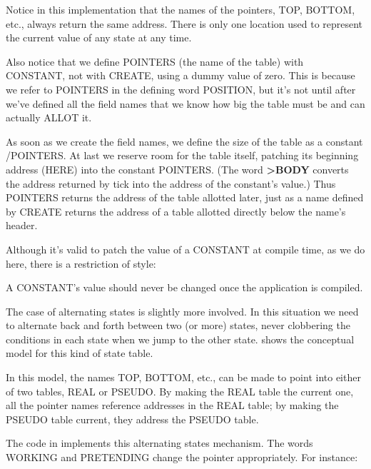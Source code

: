 Notice in this implementation that the names of the pointers, TOP,
BOTTOM, etc., always return the same address. There is only one location
used to represent the current value of any state at any time.

Also notice that we define POINTERS (the name of the table) with
CONSTANT, not with CREATE, using a dummy value of zero. This is
because we refer to POINTERS in the defining word POSITION, but it's
not until after we've defined all the field names that we know how big the
table must be and can actually ALLOT it.

As soon as we create the field names, we define the size of the table
as a constant /POINTERS. At last we reserve room for the table itself,
patching its beginning address (HERE) into the constant POINTERS.
(The word \textbf{>BODY} converts the address returned by tick into the
address of the constant's value.) Thus POINTERS returns the address of
the table allotted later, just as a name defined by CREATE returns the
address of a table allotted directly below the name's header.

Although it's valid to patch the value of a CONSTANT at compile
time, as we do here, there is a restriction of style:

\begin{tip}
A CONSTANT's value should never be changed once the application is
compiled.
\end{tip}
The case of alternating states is slightly more involved. In this situation
we need to alternate back and forth between two (or more) states, never
clobbering the conditions in each state when we jump to the other state.
 shows the conceptual model for this kind of state table.



In this model, the names TOP, BOTTOM, etc., can be made to point
into either of two tables, REAL or PSEUDO. By making the REAL table
the current one, all the pointer names reference addresses in the REAL
table; by making the PSEUDO table current, they address the PSEUDO
table.

The code in  implements this alternating states
mechanism. The words WORKING and PRETENDING change the
pointer appropriately. For instance:

